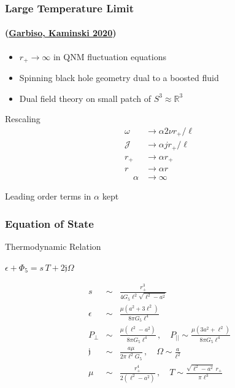 \documentclass[aspectratio=169, xcolor=dvipsnames]{beamer}
\begin{document}
\begin{frame}[squeeze]
  \frametitle{Large Temperature Limit}
  \framesubtitle{(\href{https://inspirehep.net/literature/1806001}{Garbiso, Kaminski 2020})}

  \begin{itemize}
    \item $r_+ \to \infty$ in QNM fluctuation equations
    \item Spinning black hole geometry dual to a boosted fluid
    \item Dual field theory on small patch of $S^3 \approx \mathbb{R}^3$
  \end{itemize}

  \begin{block}{Rescaling}
    \begin{equation*}
      \begin{aligned}
        \omega &\to \alpha 2\nu r_+/\ell \\
        \mathcal{J} &\to \alpha j r_+/\ell \\
        r_+ &\to \alpha r_+ \\
        r &\to \alpha r\\
        \quad \alpha&\to\infty
      \end{aligned}
    \end{equation*}
  \end{block}

  \begin{alertblock}{}
    Leading order terms in $\alpha$ kept
  \end{alertblock}

\end{frame}

\begin{frame}
  \frametitle{Equation of State}

  \begin{block}{Thermodynamic Relation}
    \begin{center}
      $\epsilon + \Phi_5 = s \, T + 2\mathfrak{j}\Omega$
    \end{center}
  \end{block}

  {\small
    \begin{eqnarray*}
      s&\sim& \frac{r_+^3}{4 G_5 \ell^2 \sqrt{\ell^2-a^2}} \\
      \epsilon &\sim& \frac{\mu (a^2+3 \ell^2)}{8 \pi G_5 \ell^4} \\ 
      P_\perp &\sim& \frac{\mu (\ell^2-a^2) }{8 \pi G_5 \ell^4}\, , \quad P_{||} \sim \frac{\mu (3 a^2+ \ell^2)}{8 \pi G_5 \ell^4} \\
      \mathfrak{j} &\sim& \frac{a \mu}{2\pi \ell^2 G_5}  \, , \quad \Omega \sim \frac{a}{\ell^2}\\ 
      \mu &\sim& \frac{r_+^4}{2 (\ell^2 - a^2)} \,,\quad T \sim \frac{\sqrt{\ell^2-a^2}~r_+}{\pi \ell^3}
    \end{eqnarray*}
  }

\end{frame}
\end{document}
